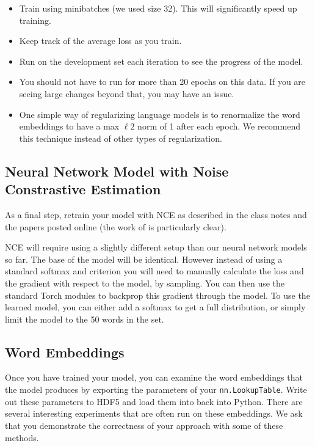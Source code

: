 \documentclass[11pt]{article}
\begin{document}
 \begin{itemize}
 \item Train using minibatches (we used size 32). This will significantly speed up training. 
 \item Keep track of the average loss as you train. 
 \item Run on the development set each iteration to see the progress of the model.
 \item You should not have to run for more than 20 epochs on this data. If you are seeing large 
   changes beyond that, you may have an issue. 
 \item One simple way of regularizing language models is to
   renormalize the word embeddings to have a max $\ell2$ norm of 1
   after each epoch. We recommend this technique instead of other
   types of regularization.

 \end{itemize}

\subsection{Neural Network Model with Noise Constrastive Estimation}

As a final step, retrain your model with NCE as described in the class notes 
and the papers posted online (the work of \citet{mnih2013learning} is particularly clear).

NCE will require using a slightly different setup than our neural
network models so far.  The base of the model will be identical.
However instead of using a standard softmax and criterion you will
need to manually calculate the loss and the gradient with respect to
the model, by sampling. You can then use the standard Torch modules to
backprop this gradient through the model. To use the learned model,
you can either add a softmax to get a full distribution, or simply 
limit the model to the 50 words in the set. 
 

\subsection{Word Embeddings}

Once you have trained your model, you can examine the word embeddings that the model 
produces by exporting the parameters of your \texttt{nn.LookupTable}. Write out these 
parameters to HDF5 and load them into back into Python. There are several interesting 
experiments that are often run on these embeddings. We ask that you demonstrate the 
correctness of your approach with some of these methods.
\end{document}
